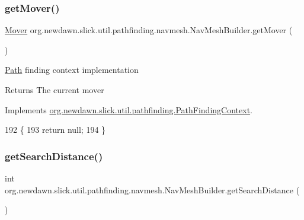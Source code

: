 \subsubsection{\texorpdfstring{get\+Mover()}{getMover()}}
{\footnotesize\ttfamily \mbox{\hyperlink{interfaceorg_1_1newdawn_1_1slick_1_1util_1_1pathfinding_1_1_mover}{Mover}} org.\+newdawn.\+slick.\+util.\+pathfinding.\+navmesh.\+Nav\+Mesh\+Builder.\+get\+Mover (\begin{DoxyParamCaption}{ }\end{DoxyParamCaption})\hspace{0.3cm}{\ttfamily [inline]}}

\mbox{\hyperlink{classorg_1_1newdawn_1_1slick_1_1util_1_1pathfinding_1_1_path}{Path}} finding context implementation

\begin{DoxyReturn}{Returns}
The current mover 
\end{DoxyReturn}


Implements \mbox{\hyperlink{interfaceorg_1_1newdawn_1_1slick_1_1util_1_1pathfinding_1_1_path_finding_context_a50e439d467ccdf457dca18ca60ab367c}{org.\+newdawn.\+slick.\+util.\+pathfinding.\+Path\+Finding\+Context}}.


\begin{DoxyCode}
192                             \{
193         \textcolor{keywordflow}{return} null;
194     \}
\end{DoxyCode}
\mbox{\label{classorg_1_1newdawn_1_1slick_1_1util_1_1pathfinding_1_1navmesh_1_1_nav_mesh_builder_ad5148985f384f4fd0a1bc61ad92c7ea9}} 
\subsubsection{\texorpdfstring{get\+Search\+Distance()}{getSearchDistance()}}
{\footnotesize\ttfamily int org.\+newdawn.\+slick.\+util.\+pathfinding.\+navmesh.\+Nav\+Mesh\+Builder.\+get\+Search\+Distance (\begin{DoxyParamCaption}{ }\end{DoxyParamCaption})\hspace{0.3cm}{\ttfamily [inline]}}

